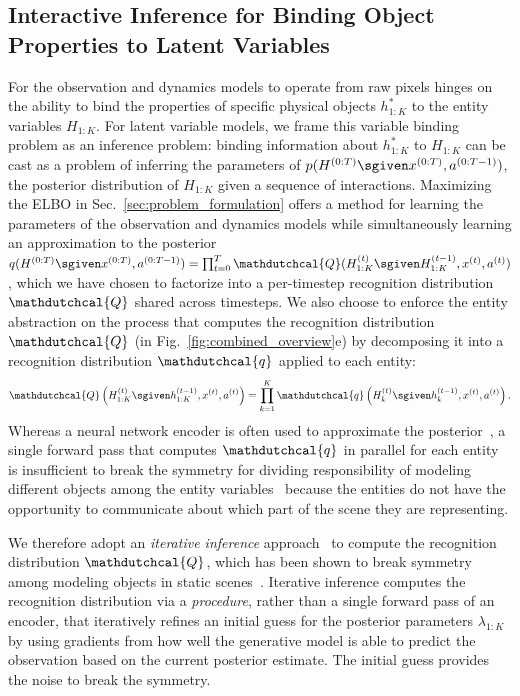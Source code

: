 \subsection{Interactive Inference for Binding Object Properties to Latent Variables} \label{sec:op3_inference}
For the observation and dynamics models to operate from raw pixels hinges on the ability to bind the properties of specific physical objects $h^*_{1:K}$ to the entity variables $H_{1:K}$.
For latent variable models, we frame this variable binding problem as an inference problem: binding information about $h^*_{1:K}$ to $H_{1:K}$ can be cast as a problem of inferring the parameters of $p(H^{(0:T)} \sgiven x^{(0:T)}, a^{(0:T-1)})$, the posterior distribution of $H_{1:K}$ given a sequence of interactions.
Maximizing the ELBO in Sec.~\ref{sec:problem_formulation} offers a method for learning the parameters of the observation and dynamics models while simultaneously learning an approximation to the posterior $q(H^{(0:T)} \sgiven x^{(0:T)}, a^{(0:T-1)}) = \prod_{t=0}^T \mathdutchcal{Q}(H^{(t)}_{1:K} \sgiven H^{(t-1)}_{1:K}, x^{(t)}, a^{(t)})$, which we have chosen to factorize into a per-timestep recognition distribution $\mathdutchcal{Q}$ shared across timesteps.
We also choose to enforce the entity abstraction on the process that computes the recognition distribution $\mathdutchcal{Q}$ (in Fig.~\ref{fig:combined_overview}e) by decomposing it into a recognition distribution $\mathdutchcal{q}$ applied to each entity:
\footnotesize
\begin{align}
    \mathdutchcal{Q}\left(H^{(t)}_{1:K} \sgiven h^{(t-1)}_{1:K}, x^{(t)}, a^{(t)}\right) = \prod_{k=1}^K \mathdutchcal{q}\left(H^{(t)}_{k} \sgiven h^{(t-1)}_{k}, x^{(t)}, a^{(t)}\right).
\end{align} 
\normalsize
Whereas a neural network encoder is often used to approximate the posterior~\citep{hafner2018learning,xu2018modeling,kulkarni2019unsupervised}, a single forward pass that computes $\mathdutchcal{q}$ in parallel for each entity is insufficient to break the symmetry for dividing responsibility of modeling different objects among the entity variables~\citep{zhang2019set} because the entities do not have the opportunity to communicate about which part of the scene they are representing.

We therefore adopt an \textit{iterative inference} approach~\citep{marino2018iterative} to compute the recognition distribution $\mathdutchcal{Q}$, which has been shown to break symmetry among modeling objects in static scenes~\citep{greff2019iodine}.
Iterative inference computes the recognition distribution via a \textit{procedure}, rather than a single forward pass of an encoder, that iteratively refines an initial guess for the posterior parameters $\lambda_{1:K}$ by using gradients from how well the generative model is able to predict the observation based on the current posterior estimate.
The initial guess provides the noise to break the symmetry.

